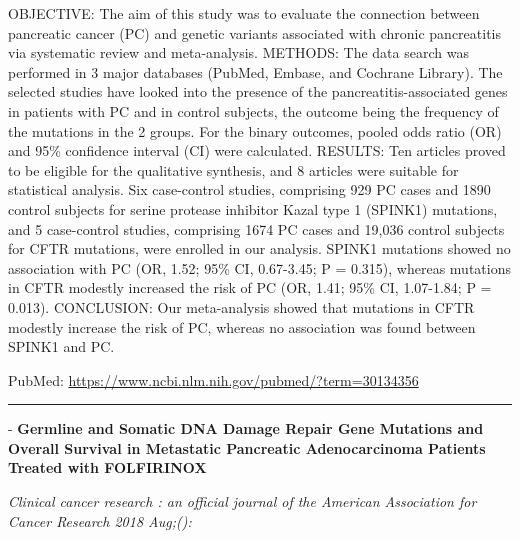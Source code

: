 \documentclass[]{article}
\begin{document}
OBJECTIVE: The aim of this study was to evaluate the connection between
pancreatic cancer (PC) and genetic variants associated with chronic
pancreatitis via systematic review and meta-analysis. METHODS: The data
search was performed in 3 major databases (PubMed, Embase, and Cochrane
Library). The selected studies have looked into the presence of the
pancreatitis-associated genes in patients with PC and in control
subjects, the outcome being the frequency of the mutations in the 2
groups. For the binary outcomes, pooled odds ratio (OR) and 95\%
confidence interval (CI) were calculated. RESULTS: Ten articles proved
to be eligible for the qualitative synthesis, and 8 articles were
suitable for statistical analysis. Six case-control studies, comprising
929 PC cases and 1890 control subjects for serine protease inhibitor
Kazal type 1 (SPINK1) mutations, and 5 case-control studies, comprising
1674 PC cases and 19,036 control subjects for CFTR mutations, were
enrolled in our analysis. SPINK1 mutations showed no association with PC
(OR, 1.52; 95\% CI, 0.67-3.45; P = 0.315), whereas mutations in CFTR
modestly increased the risk of PC (OR, 1.41; 95\% CI, 1.07-1.84; P =
0.013). CONCLUSION: Our meta-analysis showed that mutations in CFTR
modestly increase the risk of PC, whereas no association was found
between SPINK1 and PC.

PubMed: \url{https://www.ncbi.nlm.nih.gov/pubmed/?term=30134356}

{}

{}

\begin{center}\rule{0.5\linewidth}{\linethickness}\end{center}

 - \textbf{Germline and Somatic DNA Damage Repair Gene Mutations and
Overall Survival in Metastatic Pancreatic Adenocarcinoma Patients
Treated with FOLFIRINOX}

\emph{Clinical cancer research : an official journal of the American
Association for Cancer Research 2018 Aug;():}
\end{document}
